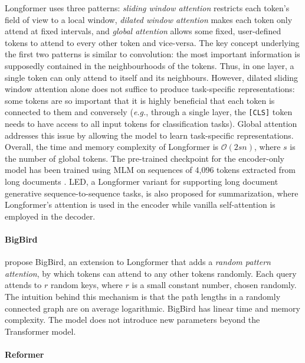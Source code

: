 Longformer \citep{beltagy2020longformer} uses three patterns: \textit{sliding window attention} restricts each token's field of view to a local window, \textit{dilated window attention} makes each token only attend at fixed intervals, and \textit{global attention} allows some fixed, user-defined tokens to attend to every other token and vice-versa. The key concept underlying the first two patterns is similar to convolution: the most important information is supposedly contained in the neighbourhoods of the tokens. Thus, in one layer, a single token can only attend to itself and its neighbours. However, dilated sliding window attention alone does not suffice to produce task-specific representations: some tokens are so important that it is highly beneficial that each token is connected to them and conversely (\textit{e.g.}, through a single layer, the \texttt{[CLS]} token needs to have access to all input tokens for classification tasks). Global attention addresses this issue by allowing the model to learn task-specific representations. Overall, the time and memory complexity of Longformer is $\mathcal{O}(2sn)$, where $s$ is the number of global tokens. The pre-trained checkpoint for the encoder-only model has been trained using \ac{MLM} on sequences of 4,096 tokens extracted from long documents \citep{trinh2018simple, zellers2019defending}. \ac{LED}, a Longformer variant for supporting long document generative sequence-to-sequence tasks, is also proposed for summarization, where Longformer's attention is used in the encoder while vanilla self-attention is employed in the decoder.

\paragraph{BigBird}

\citet{zaheer2020big} propose BigBird, an extension to Longformer that adds a \textit{random pattern attention}, by which tokens can attend to any other tokens randomly. Each query attends to $r$ random keys, where $r$ is a small constant number, chosen randomly. The intuition behind this mechanism is that the path lengths in a randomly connected graph are on average logarithmic. BigBird has linear time and memory complexity. The model does not introduce new parameters beyond the Transformer model. 

\paragraph{Reformer}

